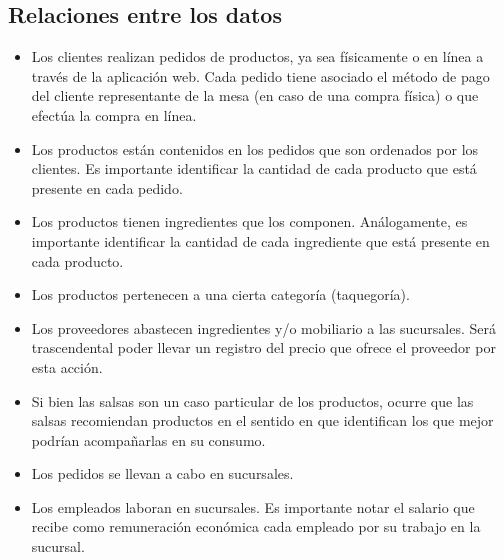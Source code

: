 \documentclass[11pt,letterpaper]{article}
\begin{document}
\subsection{Relaciones entre los datos}

\begin{itemize}
\item Los clientes realizan pedidos de productos, ya sea físicamente o en línea a través de la aplicación web. Cada pedido tiene asociado el método de pago del cliente representante de la mesa (en caso de una compra física) o que efectúa la compra en línea.
\item Los productos están contenidos en los pedidos que son ordenados por los clientes. Es importante identificar la cantidad de cada producto que está presente en cada pedido.
\item Los productos tienen ingredientes que los componen. Análogamente, es importante identificar la cantidad de cada ingrediente que está presente en cada producto.
\item Los productos pertenecen a una cierta categoría (taquegoría).
\item Los proveedores abastecen ingredientes y/o mobiliario a las sucursales. Será trascendental poder llevar un registro del precio que ofrece el proveedor por esta acción.
\item Si bien las salsas son un caso particular de los productos, ocurre que las salsas recomiendan productos en el sentido en que identifican los que mejor podrían acompañarlas en su consumo.
\item Los pedidos se llevan a cabo en sucursales.
\item Los empleados laboran en sucursales. Es importante notar el salario que recibe como remuneración económica cada empleado por su trabajo en la sucursal.  
\end{itemize}
\end{document}
